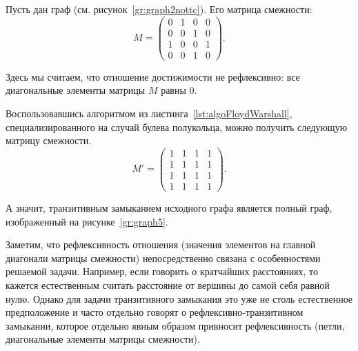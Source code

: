 \begin{marginfigure}
    \begin{center}
        \resizebox{\marginparwidth}{!}{}
    \end{center}
    \caption{Не полный граф}
    \label{gr:graph2nottc}
\end{marginfigure}
\begin{marginfigure}
    \begin{center}
        \resizebox{\marginparwidth}{!}{}
    \end{center}
    \caption{Полный граф}
    \label{gr:graph5}
\end{marginfigure}
\begin{example}
    \label{exmpl:transitiveClosure}
    Пусть дан граф (см. рисунок~\ref{gr:graph2nottc}).
    Его матрица смежности:
    \[
        M =
        \begin{pmatrix}
            0 & 1 & 0 & 0 \\
            0 & 0 & 1 & 0 \\
            1 & 0 & 0 & 1 \\
            0 & 0 & 1 & 0
        \end{pmatrix}.
    \]

    Здесь мы считаем, что отношение достижимости не рефлексивно: все диагональные элементы матрицы $M$ равны 0.

    Воспользовавшись алгоритмом из листинга~\ref{lst:algoFloydWarshall}, специализированного на случай булева полукольца, можно получить следующую матрицу смежности.
    \[
        M' =
        \begin{pmatrix}
            1 & 1 & 1 & 1 \\
            1 & 1 & 1 & 1 \\
            1 & 1 & 1 & 1 \\
            1 & 1 & 1 & 1
        \end{pmatrix}.
    \]

    А значит, транзитивным замыканием исходного графа является полный граф, изображенный на рисунке~\ref{gr:graph5}.
\end{example}

Заметим, что рефлексивность отношения (значения элементов на главной диагонали матрицы смежности) непосредственно связана с особенностями решаемой задачи.
Например, если говорить о кратчайших расстояниях, то кажется естественным считать расстояние от вершины до самой себя равной нулю.
Однако для задачи транзитивного замыкания это уже не столь естественное предположение и часто отдельно говорят о рефлексивно-транзитивном замыкании, которое отдельно явным образом привносит рефлексивность (петли, диагональные элементы матрицы смежности).

